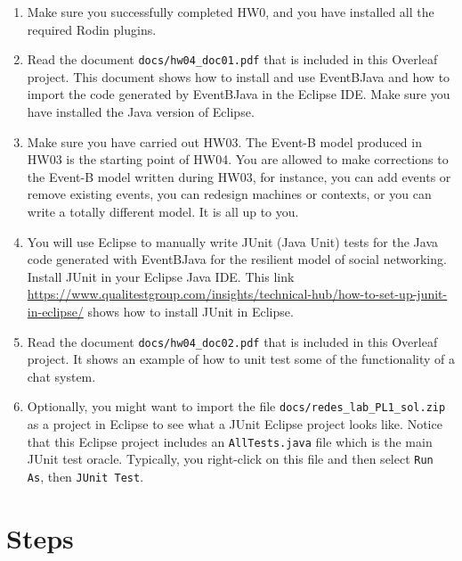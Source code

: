 \documentclass{article} %
\newcommand{\eb}{\textsf{Event-B}\xspace}
\newcommand{\ebtj}{\textsf{Event\-B\-2\-Java}\xspace}
\begin{document}
\begin{enumerate}[leftmargin=*, label=(\textbf{\alph*}), itemsep=-5pt]
\item Make sure you successfully completed HW0, and you have installed all the required Rodin plugins.
\item Read the document \texttt{docs/\-hw04\_\-doc01.\-pdf} that is included in this Overleaf project. This document shows how to install and use \ebtj and how to import the code generated by \ebtj in the Eclipse IDE. Make sure you have installed the Java version of Eclipse.
\item Make sure you have carried out HW03. The \eb model produced in HW03 is the starting point of
  HW04. You are allowed to make corrections to the \eb model written during HW03, for instance, you
  can add events or remove existing events, you can redesign machines or contexts, or you can write
  a totally different model. It is all up to you.
\item You will use Eclipse to manually write JUnit (Java Unit) tests for the Java code generated with
  \ebtj for the resilient model of social networking. Install JUnit in your Eclipse Java
  IDE. This link
  \href{https://www.qualitestgroup.com/insights/technical-hub/how-to-set-up-junit-in-eclipse/} {https://\-www.\-qualitest\-group.\-com/\-insights/\-technical-\-hub/\-how-\-to-\-set-\-up-\-junit-\-in-\-eclipse/}
  shows how to install JUnit in Eclipse.
\item Read the document \texttt{docs/\-hw04\_\-doc02.\-pdf} that is included in this Overleaf
  project. It shows an example of how to unit test some of the functionality of a chat system.
\item Optionally, you might want to import the file
  \texttt{docs/\-redes\_\-lab\_\-PL1\_\-sol\-.zip} as a project in Eclipse to see what a JUnit
  Eclipse project looks like. Notice that this Eclipse project includes an \texttt{AllTests.java}
  file which is the main JUnit test oracle. Typically, you right-click on this file and then select
  \texttt{Run As}, then \texttt{JUnit Test}.
\end{enumerate}



\section{Steps}
\label{sec_steps}
\end{document}
